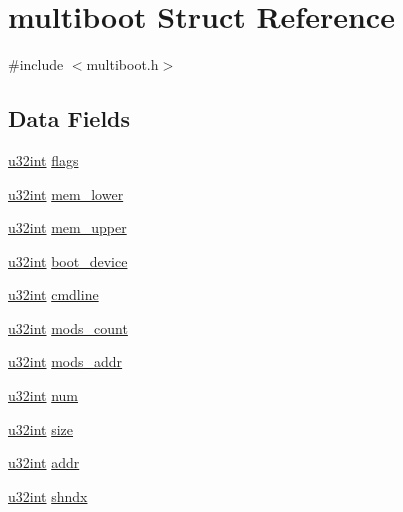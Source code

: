 \hypertarget{structmultiboot}{
\section{multiboot Struct Reference}
\label{structmultiboot}
}


{\ttfamily \#include $<$multiboot.h$>$}

\subsection*{Data Fields}
\begin{DoxyCompactItemize}
\item 
\hyperlink{library_8h_ad7ecf93b77285d9bf039d27fa3f1a588}{u32int} \hyperlink{structmultiboot_a3c67431132e70c431fbfc3bf03a63dd4}{flags}
\item 
\hyperlink{library_8h_ad7ecf93b77285d9bf039d27fa3f1a588}{u32int} \hyperlink{structmultiboot_a2e26dd5cb6e6ff946d30339b5dd1969d}{mem\_\-lower}
\item 
\hyperlink{library_8h_ad7ecf93b77285d9bf039d27fa3f1a588}{u32int} \hyperlink{structmultiboot_a812f64d9a61cbd147d74184fb27cf4fd}{mem\_\-upper}
\item 
\hyperlink{library_8h_ad7ecf93b77285d9bf039d27fa3f1a588}{u32int} \hyperlink{structmultiboot_a38d97031da6dcf05d32af63d0f559f83}{boot\_\-device}
\item 
\hyperlink{library_8h_ad7ecf93b77285d9bf039d27fa3f1a588}{u32int} \hyperlink{structmultiboot_a94e0737ae00bddbac4422634b072ed29}{cmdline}
\item 
\hyperlink{library_8h_ad7ecf93b77285d9bf039d27fa3f1a588}{u32int} \hyperlink{structmultiboot_a4583c5566a915d416ad288ecda27821c}{mods\_\-count}
\item 
\hyperlink{library_8h_ad7ecf93b77285d9bf039d27fa3f1a588}{u32int} \hyperlink{structmultiboot_a94ec60a30a04b4f3d4e259805088b3ba}{mods\_\-addr}
\item 
\hyperlink{library_8h_ad7ecf93b77285d9bf039d27fa3f1a588}{u32int} \hyperlink{structmultiboot_ad359bb84532ae5a74868eb669d4e4cac}{num}
\item 
\hyperlink{library_8h_ad7ecf93b77285d9bf039d27fa3f1a588}{u32int} \hyperlink{structmultiboot_a8c5ccb4d457cb24df33a7c9facfa2650}{size}
\item 
\hyperlink{library_8h_ad7ecf93b77285d9bf039d27fa3f1a588}{u32int} \hyperlink{structmultiboot_a48f994dfe1a5aea3bce6dc7d2be8efd5}{addr}
\item 
\hyperlink{library_8h_ad7ecf93b77285d9bf039d27fa3f1a588}{u32int} \hyperlink{structmultiboot_adde24ffd0b3acf092bc1776da5c15815}{shndx}

\end{DoxyCompactItemize}
